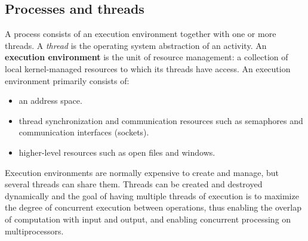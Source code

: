 \subsection{Processes and threads}
A process consists of an execution environment together with one or more threads. A \textit{thread} is the operating system abstraction of an activity. An \textbf{execution environment} is the unit of resource management: a collection of local kernel-managed resources to which its threads have access. An execution environment primarily consists of:
\begin{itemize}
	\item an address space.
	\item thread synchronization and communication resources such as semaphores and
	communication interfaces (sockets).
	\item higher-level resources such as open files and windows.
\end{itemize}
Execution environments are normally expensive to create and manage, but several threads can share them. Threads can be created and destroyed dynamically and the goal of having multiple threads of execution is to maximize the degree of concurrent execution between operations, thus enabling the overlap of computation with input and output, and enabling concurrent processing on multiprocessors.


